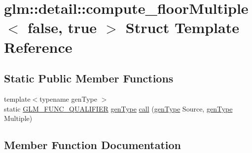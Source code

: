 \hypertarget{structglm_1_1detail_1_1compute__floor_multiple_3_01false_00_01true_01_4}{}\section{glm\+:\+:detail\+:\+:compute\+\_\+floor\+Multiple$<$ false, true $>$ Struct Template Reference}
\label{structglm_1_1detail_1_1compute__floor_multiple_3_01false_00_01true_01_4}
\subsection*{Static Public Member Functions}
\begin{DoxyCompactItemize}
\item 
{\footnotesize template$<$typename gen\+Type $>$ }\\static \mbox{\hyperlink{setup_8hpp_a33fdea6f91c5f834105f7415e2a64407}{G\+L\+M\+\_\+\+F\+U\+N\+C\+\_\+\+Q\+U\+A\+L\+I\+F\+I\+ER}} \mbox{\hyperlink{structglm_1_1detail_1_1gen_type}{gen\+Type}} \mbox{\hyperlink{structglm_1_1detail_1_1compute__floor_multiple_3_01false_00_01true_01_4_a1d2dfa9746c67e805de83b41b6a7a94d}{call}} (\mbox{\hyperlink{structglm_1_1detail_1_1gen_type}{gen\+Type}} Source, \mbox{\hyperlink{structglm_1_1detail_1_1gen_type}{gen\+Type}} Multiple)
\end{DoxyCompactItemize}


\subsection{Member Function Documentation}
\mbox{\label{structglm_1_1detail_1_1compute__floor_multiple_3_01false_00_01true_01_4_a1d2dfa9746c67e805de83b41b6a7a94d}} 
